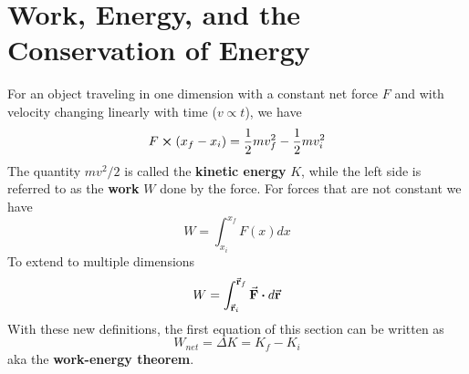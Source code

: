\section{Work, Energy, and the Conservation of Energy}
    For an object traveling in one dimension with a constant net force $F$ and with velocity changing linearly with time ($v \propto t$), we have
    \begin{equation*}
        F \cross (x_f - x_i) = \frac{1}{2}mv_f^2 - \frac{1}{2}mv_i^2
    \end{equation*}
    The quantity $mv^2 / 2$ is called the \textbf{kinetic energy} $K$, while the left side is referred to as the \textbf{work} $W$ done by the force. For forces that are not constant we have
    \begin{equation*}
        W = \int_{x_i}^{x_f}F(x) dx
    \end{equation*}
    To extend to multiple dimensions
    \begin{equation*}
        W = \int_{\va{r}_i}^{\va{r}_f} \va{F} \vdot d\va{r}
    \end{equation*}
    With these new definitions, the first equation of this section can be written as
    \begin{equation*}
        W_{net} = \Delta K = K_f - K_i
    \end{equation*}
    aka the \textbf{work-energy theorem}.